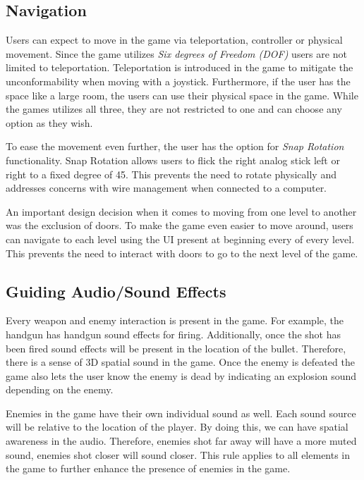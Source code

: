 \documentclass[12pt, twoside]{article}
\begin{document}
\subsection{Navigation}
Users can expect to move in the game via teleportation, controller or physical
movement. Since the game utilizes \emph{Six degrees of Freedom (DOF)} users are
not limited to teleportation. Teleportation is introduced in the game to
mitigate the unconformability when moving with a joystick. Furthermore, if the
user has the space like a large room, the users can use their physical space in
the game. While the games utilizes all three, they are not restricted to one and
can choose any option as they wish.\par 

To ease the movement even further, the user has the option for \emph{Snap
Rotation} functionality. Snap Rotation allows users to flick the right analog
stick left or right to a fixed degree of 45\textdegree. This prevents the need
to rotate physically and addresses concerns with wire management when connected
to a computer.\par

An important design decision when it comes to moving from one level to another
was the exclusion of doors. To make the game even easier to move around, users
can navigate to each level using the UI present at beginning every of every
level. This prevents the need to interact with doors to go to the next level of
the game.

\subsection{Guiding Audio/Sound Effects}
Every weapon and enemy interaction is present in the game. For example, the
handgun has handgun sound effects for firing. Additionally, once the shot has
been fired sound effects will be present in the location of the bullet.
Therefore, there is a sense of 3D spatial sound in the game. Once the enemy is
defeated the game also lets the user know the enemy is dead by indicating an
explosion sound depending on the enemy. \par

Enemies in the game have their own individual sound as well. Each sound source
will be relative to the location of the player. By doing this, we can have
spatial awareness in the audio. Therefore, enemies shot far away will have a
more muted sound, enemies shot closer will sound closer. This rule applies to
all elements in the game to further enhance the presence of enemies in the
game.\par 
\end{document}
